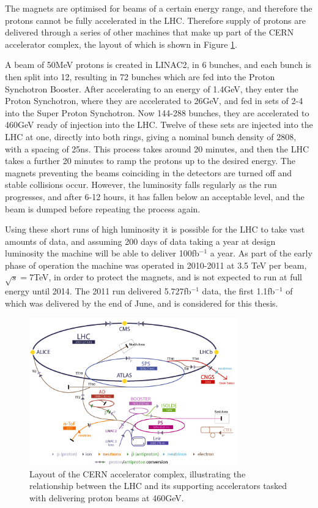 The magnets are optimised for beams of a certain energy range, and therefore the protons cannot be fully accelerated in the LHC. Therefore supply of protons are delivered through a series of other machines that make up part of the CERN accelerator complex, the layout of which is shown in Figure \ref{fig:LHCinject}. 

A beam of 50MeV protons is created in LINAC2, in 6 bunches, and each bunch is then split into 12, resulting in 72 bunches which are fed into the Proton Synchotron Booster. After accelerating to an energy of 1.4GeV, they enter the Proton Synchotron, where they are accelerated to 26GeV, and fed in sets of 2-4 into the Super Proton Synchotron. Now 144-288 bunches, they are accelerated to 460GeV ready of injection into the LHC. Twelve of these sets are injected into the LHC at one, directly into both rings, giving a nominal bunch density of 2808, with a spacing of 25ns. This process takes around 20 minutes, and then the LHC takes a further 20 minutes to ramp the protons up to the desired energy. The magnets preventing the beams coinciding in the detectors are turned off and stable collisions occur. However, the luminosity falls regularly as the run progresses, and after 6-12 hours, it has fallen below an acceptable level, and the beam is dumped before repeating the process again. 

Using these short runs of high luminosity it is possible for the LHC to take vast amounts of data, and assuming 200 days of data taking a year  at design luminosity the machine will be able to deliver 100fb$^{-1}$ a year. As part of the early phase of operation the machine was operated in 2010-2011 at 3.5 TeV per beam, $\sqrt{s} = $7TeV, in order to protect the magnets, and is not expected to run at full energy until 2014. The 2011 run delivered 5.727fb$^{-1}$ data, the first 1.1fb$^{-1}$ of which was delivered by the end of June, and is considered for this thesis.

\begin{figure}
\centering
\includegraphics[width=0.8\textwidth]{Figures/Detector/injection}
\caption{Layout of the CERN accelerator complex, illustrating the relationship between the LHC and its supporting accelerators tasked with delivering proton beams at 460GeV.}
\label{fig:LHCinject}
\end{figure}




